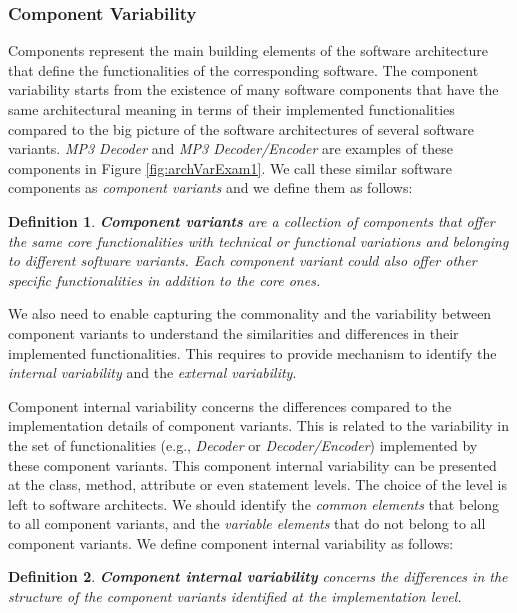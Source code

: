 \documentclass[graybox]{svmult}
\newtheorem{mydef}{Definition}
\begin{document}
\subsubsection{Component Variability}

Components represent the main building elements of the software architecture that define the functionalities of the corresponding software. 
The component variability starts from the existence of many software components that have the same architectural meaning in terms of their implemented functionalities compared to the big picture of the software architectures of several software variants. \textit{MP3 Decoder} and \textit{MP3 Decoder/Encoder} are examples of these components in Figure \ref{fig:archVarExam1}. We call these similar software components as \textit{component variants} and we define them as follows: 

\begin{mydef}
\textbf{Component variants} are a collection of components that offer the same core functionalities with technical or functional variations and belonging to different software variants.  Each component variant could also offer other specific functionalities in addition to the core ones. 
\end{mydef} 



We also need to enable capturing the commonality and the variability between component variants to understand the similarities and differences in their  implemented functionalities. This requires to provide mechanism to identify the \textit{internal variability} and the \textit{external variability}.


Component internal variability concerns the differences compared to the implementation details of component variants. This is related to the variability in the set of functionalities (e.g., \textit{Decoder} or \textit{Decoder/Encoder}) implemented by these component variants. This component internal variability can be presented at the class, method, attribute or even statement levels. The choice of the level is left to software architects. We should identify the \textit{common elements} that belong to all component variants, and the \textit{variable elements} that do not belong to all component variants. We define component internal variability as follows:

\begin{mydef}
\textbf{Component internal variability} concerns the differences in the structure of the component variants identified at the implementation level. 
\end{mydef}
\end{document}
